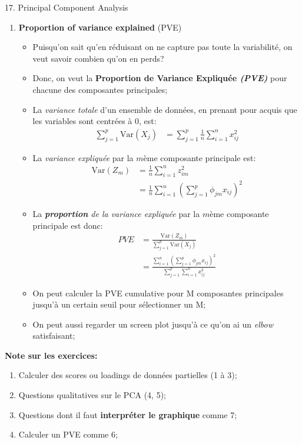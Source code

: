 \documentclass[12pt, titlepage, french]{report}
\begin{document}
\begin{CHPT_SUMM}[label = {PCA-PCA}]{17. Principal Component Analysis}
\begin{enumerate}
\begin{itemize}
		\texttt{[image: src/PCA-SCALING.png]}
		\end{itemize}
	\item	\textbf{Proportion of variance explained} (PVE)
		\begin{itemize}
		\item	Puisqu'on sait qu'en réduisant on ne capture pas toute la variabilité, on veut savoir combien qu'on en perds?
		\item	Donc, on veut la \textbf{Proportion de Variance Expliquée \textit{(PVE)}} pour chacune des composantes principales;
		\item	La \textit{variance totale} d'un ensemble de données, en prenant pour acquis que les variables sont centrées à 0, est:
			\begin{align*}
			\sum_{j = 1}^{p} \text{Var}(X_{j})	&=	\sum_{j = 1}^{p} \frac{1}{n} \sum_{i = 1}^{n} x_{ij}^{2}
			\end{align*}
		\item	La \textit{variance expliquée} par la $m$ème composante principale est:
			\begin{align*}
			\text{Var}(Z_{m})
			&=	\frac{1}{n} \sum_{i = 1}^{n}	z^{2}_{im} \\
			&= \frac{1}{n} \sum_{i = 1}^{n} \left( \sum_{j = 1}^{p} \phi_{jm} x_{ij} \right)^{2}
			\end{align*}
		\item	La \textit{\textbf{proportion} de la variance expliquée} par la $m$ème composante principale est donc:
			\begin{align*}
			PVE	
			&=	\frac{\text{Var}(Z_{m})}{\sum_{j = 1}^{p} \text{Var}(X_{j})}	\\
			&=	\frac{\sum_{i = 1}^{n} \left( \sum_{j = 1}^{p} \phi_{jm} x_{ij} \right)^{2}}{\sum_{j = 1}^{p} \sum_{i = 1}^{n} x_{ij}^{2}}	
			\end{align*}
		\item	On peut calculer la PVE cumulative pour M composantes principales jusqu'à un certain seuil pour sélectionner un M;
		\item	On peut aussi regarder un screen plot jusqu'à ce qu'on ai un \textit{elbow} satisfaisant;
		\end{itemize}
\end{enumerate}

\textbf{Note sur les exercices:} 
\begin{enumerate}
	\item	Calculer des scores ou loadings de données partielles (1 à 3);
	\item	Questions qualitatives sur le PCA (4, 5);
	\item	Questions dont il faut \textbf{interpréter le graphique} comme 7;
	\item	Calculer un PVE comme 6;
\end{enumerate}
\end{CHPT_SUMM}
\end{document}
